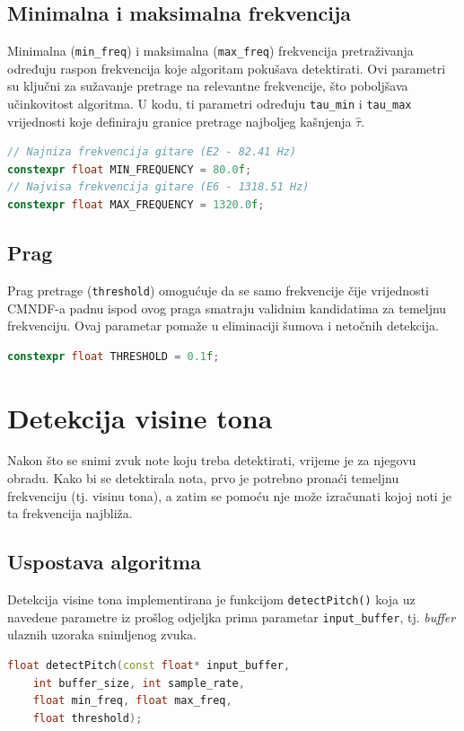 \documentclass[times, utf8, diplomski, numeric]{fer}
\begin{document}
\subsection{Minimalna i maksimalna frekvencija}
%
Minimalna (\verb*|min_freq|) i maksimalna (\verb*|max_freq|) frekvencija pretraživanja određuju raspon frekvencija koje algoritam pokušava detektirati. Ovi parametri su ključni za sužavanje pretrage na relevantne frekvencije, što poboljšava učinkovitost algoritma. U kodu, ti parametri određuju \verb*|tau_min| i \verb*|tau_max| vrijednosti koje definiraju granice pretrage najboljeg kašnjenja $\hat{\tau}$.
\begin{lstlisting}[language=C++, frame=single]
// Najniza frekvencija gitare (E2 - 82.41 Hz)
constexpr float MIN_FREQUENCY = 80.0f;
// Najvisa frekvencija gitare (E6 - 1318.51 Hz)
constexpr float MAX_FREQUENCY = 1320.0f;
\end{lstlisting}

\subsection{Prag}
%
Prag pretrage (\verb*|threshold|) omogućuje da se samo frekvencije čije vrijednosti CMNDF-a padnu ispod ovog praga smatraju validnim kandidatima za temeljnu frekvenciju. Ovaj parametar pomaže u eliminaciji šumova i netočnih detekcija.
\begin{lstlisting}[language=C++, frame=single]
constexpr float THRESHOLD = 0.1f;
\end{lstlisting}

\section{Detekcija visine tona}
%
Nakon što se snimi zvuk note koju treba detektirati, vrijeme je za njegovu obradu. Kako bi se detektirala nota, prvo je potrebno pronaći temeljnu frekvenciju (tj. visinu tona), a zatim se pomoću nje može izračunati kojoj noti je ta frekvencija najbliža.

\subsection{Uspostava algoritma}
%
Detekcija visine tona implementirana je funkcijom \verb*|detectPitch()| koja uz navedene parametre iz prošlog odjeljka prima parametar \verb*|input_buffer|, tj. \textit{buffer} ulaznih uzoraka snimljenog zvuka.

\begin{lstlisting}[language=C++, frame=single]
float detectPitch(const float* input_buffer,
	int buffer_size, int sample_rate,
	float min_freq, float max_freq,
	float threshold);
\end{lstlisting}
\end{document}

